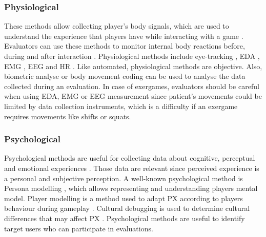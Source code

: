 \subsubsection{Physiological}
These methods allow collecting player’s body signals, which are used to understand the experience that players have while interacting with a game \autocite{Wiemeyer2016,Nacke2015}. Evaluators can use these methods to monitor internal body reactions before, during and after interaction \autocite{Mueller2011}. Physiological methods include eye-tracking \autocite{Wiemeyer2016,Nackea}, \ac{EDA} \autocite{Wiemeyer2016,Nacke2015}, \ac{EMG} \autocite{Wiemeyer2016,Nacke2015}, \ac{EEG} \autocite{Wiemeyer2016,Nacke2015} and \ac{HR} \autocite{Wiemeyer2016,Nacke2015}. Like automated, physiological methods are objective. Also, biometric analyse \autocite{Nacke2009} or body movement coding \autocite{Mueller2015,Nijhar2012} can be used to analyse the data collected during an evaluation. In case of exergames, evaluators should be careful when using \ac{EDA}, \ac{EMG} or \ac{EEG} measurement since patient’s movements could be limited by data collection instruments, which is a difficulty if an exergame requires movements like shifts or squats.
    
\subsubsection{Psychological}
Psychological methods are useful for collecting data about cognitive, perceptual and emotional experiences \autocite{Wiemeyer2016,Nackea}. Those data are relevant since perceived experience is a personal and subjective perception. A well-known psychological method is Persona modelling \autocite{Wiemeyer2016,Nackea}, which allows representing and understanding players mental model. Player modelling is a method used to adapt PX according to players behaviour during gameplay \autocite{Wiemeyer2016,Nackea}. Cultural debugging is used to determine cultural differences that may affect PX \autocite{Nackea}. Psychological methods are useful to identify target users who can participate in evaluations.



